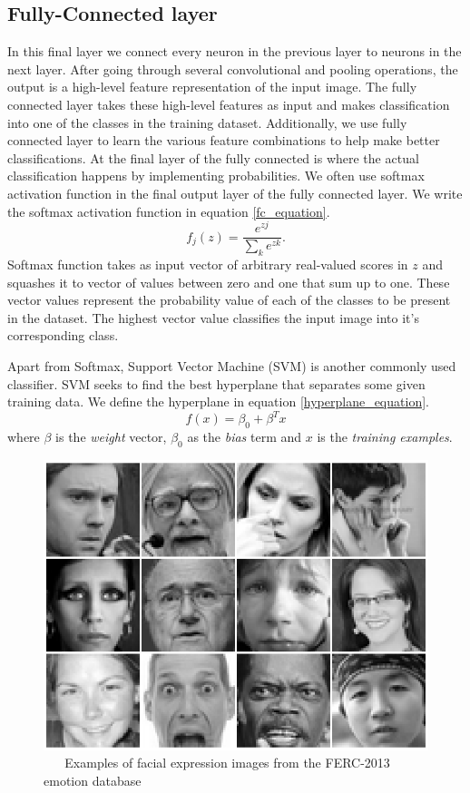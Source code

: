 \documentclass[master]{thesis-uestc}
\begin{document}
\subsection{Fully-Connected layer}
In this final layer we connect every neuron in the previous layer to neurons in the next layer. After going through several convolutional and pooling operations, the output is a high-level feature representation of the input image. The fully connected layer takes these high-level features as input and makes classification into one of the classes in the training dataset. Additionally, we use fully connected layer to learn the various feature combinations to help make better classifications. At the final layer of the fully connected is where the actual classification happens by implementing probabilities. We often use softmax activation function in the final output layer of the fully connected layer. We write the softmax activation function in equation \ref{fc_equation}.
\begin{equation}
    f_j(z) = \frac{e^{zj}}{\sum_{k}^{}e^{zk}}.
\label{fc_equation}
\end{equation}
Softmax function takes as input vector of arbitrary real-valued scores in $z$ and squashes it to vector of values between zero and one that sum up to one. These vector values represent the probability value of each of the classes to be present in the dataset. The highest vector value classifies the input image into it's corresponding class.

Apart from Softmax, Support Vector Machine (SVM) is another commonly used classifier. SVM seeks to find the best hyperplane that separates some given training data. We define the hyperplane in equation \ref{hyperplane_equation}.
\begin{equation}
    f(x) = \beta_{0} + \beta^{T} x
\label{hyperplane_equation}
\end{equation}
where $\beta$ is the \textit{weight} vector, $\beta_{0}$ as the \textit{bias} term and $x$ is the \textit{training examples}.

\begin{figure}[ht]
\includegraphics[width=5in]{pic/fer2013.png}
\caption{\,\,\,\,\,\,\,\,\,\,Examples of facial expression images from the FERC-2013 emotion database}
\label{fer2013_images}
\end{figure}
\end{document}

